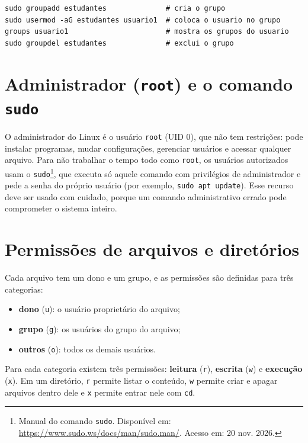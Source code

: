 \begin{lstlisting}[caption={Gerenciamento de grupos},label={lst:grupos}]
sudo groupadd estudantes              # cria o grupo
sudo usermod -aG estudantes usuario1  # coloca o usuario no grupo
groups usuario1                       # mostra os grupos do usuario
sudo groupdel estudantes              # exclui o grupo
\end{lstlisting}

\section{Administrador (\texttt{root}) e o comando \texttt{sudo}}\label{sec:root-sudo}

O administrador do Linux é o usuário \texttt{root} (UID 0), que não tem restrições: pode
instalar programas, mudar configurações, gerenciar usuários e acessar qualquer arquivo. Para
não trabalhar o tempo todo como \texttt{root}, os usuários autorizados usam o
\texttt{sudo}\footnote{Manual do comando \texttt{sudo}. Disponível em:
\url{https://www.sudo.ws/docs/man/sudo.man/}. Acesso em: 20 nov. 2026.}, que executa só aquele
comando com privilégios de administrador e pede a senha do próprio usuário (por exemplo,
\texttt{sudo apt update}). Esse recurso deve ser usado com cuidado, porque um comando
administrativo errado pode comprometer o sistema inteiro.

\section{Permissões de arquivos e diretórios}\label{sec:permissoes-arquivos}

Cada arquivo tem um dono e um grupo, e as permissões são definidas para três categorias:

\begin{itemize}
    \item \textbf{dono} (\texttt{u}): o usuário proprietário do arquivo;
    \item \textbf{grupo} (\texttt{g}): os usuários do grupo do arquivo;
    \item \textbf{outros} (\texttt{o}): todos os demais usuários.
\end{itemize}

Para cada categoria existem três permissões: \textbf{leitura} (\texttt{r}), \textbf{escrita}
(\texttt{w}) e \textbf{execução} (\texttt{x}). Em um diretório, \texttt{r} permite listar o
conteúdo, \texttt{w} permite criar e apagar arquivos dentro dele e \texttt{x} permite entrar
nele com \texttt{cd}.

